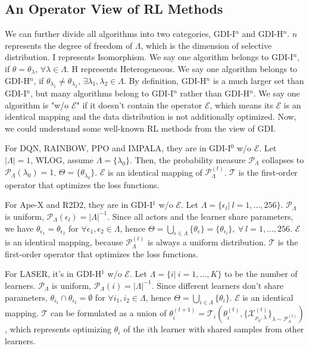 \subsection{An Operator View of RL Methods}
\label{sec: An Operator View of RL Methods}
We can further divide all algorithms into two categories, GDI-I$^n$ and GDI-H$^n$.
$n$ represents the degree of freedom of $\Lambda$, which is the dimension of selective distribution.
I represents Isomorphism. 
We say one algorithm belongs to GDI-I$^n$, if $\theta = \theta_{\lambda}, \, \forall \lambda \in \Lambda$.
H represents Heterogeneous.
We say one algorithm belongs to GDI-H$^n$, if $\theta_{\lambda_1} \neq \theta_{\lambda_2}, \, \exists \lambda_1, \lambda_2 \in \Lambda$.
By definition, GDI-H$^n$ is a much larger set than GDI-I$^n$, but many algorithms belong to GDI-I$^n$ rather than GDI-H$^n$.
We say one algorithm is "w/o $\mathcal{E}$" if it doesn't contain the operator $\mathcal{E}$, which means its $\mathcal{E}$ is an identical mapping and the data distribution is not additionally optimized. 
Now, we could understand some well-known RL methods from the view of GDI.


For DQN, RAINBOW, PPO and IMPALA, they are in GDI-I$^0$ w/o $\mathcal{E}$. Let $|\Lambda| = 1$, WLOG, assume $\Lambda = \{\lambda_0\}$.
Then, the probability measure $\mathcal{P}_{\Lambda}$ collapses to $\mathcal{P}_{\Lambda} (\lambda_0) = 1$. 
$\Theta = \{\theta_{\lambda_0}\}$.
$\mathcal{E}$ is an identical mapping of $\mathcal{P}_{\Lambda}^{(t)}$.
$\mathcal{T}$ is the first-order operator that optimizes the loss functions.

For Ape-X and R2D2, they are in GDI-I$^1$ w/o $\mathcal{E}$. 
Let $\Lambda = \{\epsilon_l |\ l = 1, \dots, 256\}$.
$\mathcal{P}_{\Lambda}$ is uniform, $\mathcal{P}_{\Lambda} (\epsilon_l) = |\Lambda|^{-1}$.
Since all actors and the learner share parameters, we have $\theta_{\epsilon_1} = \theta_{\epsilon_2}$ for $\forall \epsilon_1, \epsilon_2 \in \Lambda$, hence $\Theta = \bigcup_{\epsilon \in \Lambda} \{\theta_{\epsilon}\} = \{\theta_{\epsilon_l}\}, \ \forall\ l = 1,\dots, 256$.
$\mathcal{E}$ is an identical mapping, because $\mathcal{P}_{\Lambda}^{(t)}$ is always a uniform distribution.
$\mathcal{T}$ is the first-order operator that optimizes the loss functions.

For LASER, it's in GDI-H$^1$ w/o $\mathcal{E}$. 
Let $\Lambda = \{i |\ i = 1, \dots, K\}$ to be the number of learners.
$\mathcal{P}_{\Lambda}$ is uniform, $\mathcal{P}_{\Lambda} (i) = |\Lambda|^{-1}$.
Since different learners don't share parameters, $\theta_{i_1} \cap \theta_{i_2} = \emptyset$ for $\forall i_1, i_2 \in \Lambda$, hence $\Theta = \bigcup_{i \in \Lambda} \{\theta_i\}$.
$\mathcal{E}$ is an identical mapping.
$\mathcal{T}$ can be formulated as a union of $\theta^{(t+1)}_i 
= \mathcal{T}_{i}( \theta^{(t)}_i, \{\mathcal{X}^{(t)}_{\rho_0, \lambda}\}_{\lambda \sim \mathcal{P}^{(t)}_{\Lambda}} )$, 
which represents optimizing $\theta_i$ of the $i$th learner with shared samples from other learners.

